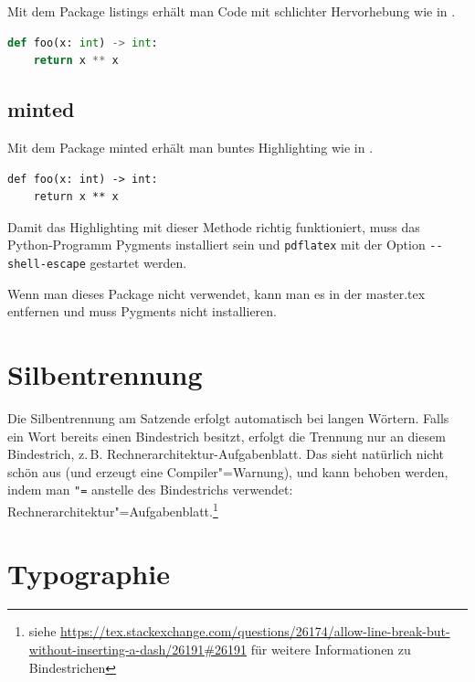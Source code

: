 Mit dem Package listings erhält man Code mit schlichter Hervorhebung wie in .

\begin{lstlisting}[language=Python, caption=Python-Beispiel, label={lst:lstlisting}]
def foo(x: int) -> int:
    return x ** x
\end{lstlisting}

\subsection{minted}

Mit dem Package minted erhält man buntes Highlighting wie in .

\begin{listing}
\begin{verbatim}
def foo(x: int) -> int:
    return x ** x
\end{verbatim}
\caption[Dasselbe Beispiel nochmal in bunt]{Dasselbe Beispiel nochmal in bunt (wenn man nur listings oder nur minted benutzt, dann ist die Nummerierung auch richtig)}
\label{lst:minted}
\end{listing}



Damit das Highlighting mit dieser Methode richtig funktioniert, muss das Python-Programm Pygments installiert sein und \texttt{pdflatex} mit der Option \texttt{-{}-shell-escape} gestartet werden.

Wenn man dieses Package nicht verwendet, kann man es in der master.tex entfernen und muss Pygments nicht installieren.

\section{Silbentrennung}

Die Silbentrennung am Satzende erfolgt automatisch bei langen Wörtern.
Falls ein Wort bereits einen Bindestrich besitzt, erfolgt die Trennung nur an diesem Bindestrich, z.\,B. Rechnerarchitektur-Aufgabenblatt.
Das sieht natürlich nicht schön aus (und erzeugt eine Compiler"=Warnung), und kann behoben werden, indem man \verb|"=| anstelle des Bindestrichs verwendet: Rechnerarchitektur"=Aufgabenblatt.\footnote{siehe \url{https://tex.stackexchange.com/questions/26174/allow-line-break-but-without-inserting-a-dash/26191\#26191} für weitere Informationen zu Bindestrichen}

\section{Typographie}

